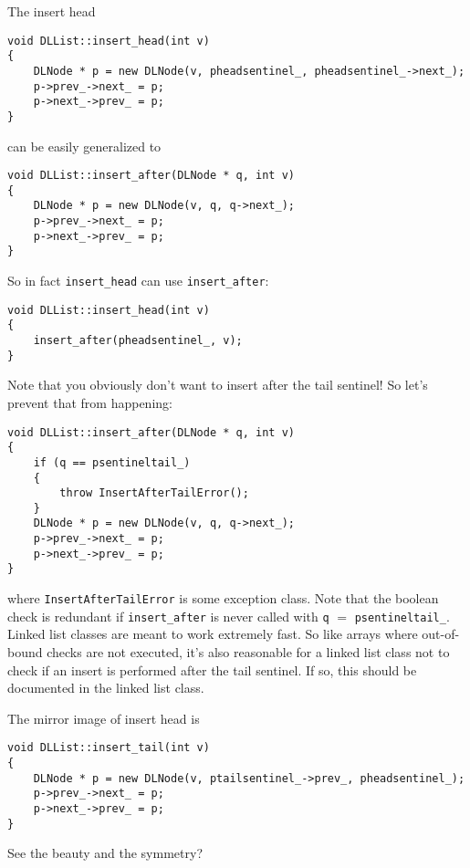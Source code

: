The insert head
\begin{Verbatim}[frame=single,fontsize=\footnotesize]
void DLList::insert_head(int v)
{
    DLNode * p = new DLNode(v, pheadsentinel_, pheadsentinel_->next_);
    p->prev_->next_ = p;
    p->next_->prev_ = p;
}
\end{Verbatim}
can be easily generalized to
\begin{Verbatim}[frame=single,fontsize=\footnotesize]
void DLList::insert_after(DLNode * q, int v)
{
    DLNode * p = new DLNode(v, q, q->next_);
    p->prev_->next_ = p;
    p->next_->prev_ = p;
}
\end{Verbatim}
So in fact \verb!insert_head! can use \verb!insert_after!:
\begin{Verbatim}[frame=single,fontsize=\footnotesize]
void DLList::insert_head(int v)
{
    insert_after(pheadsentinel_, v);
}
\end{Verbatim}
Note that you obviously don't want to insert after the tail sentinel!
So let's prevent that from happening:
\begin{Verbatim}[frame=single,fontsize=\footnotesize]
void DLList::insert_after(DLNode * q, int v)
{
    if (q == psentineltail_)
    {
        throw InsertAfterTailError();
    }
    DLNode * p = new DLNode(v, q, q->next_);
    p->prev_->next_ = p;
    p->next_->prev_ = p;
}
\end{Verbatim}
where \verb!InsertAfterTailError! is some exception class.
Note that the boolean check is redundant if \verb!insert_after!
is never called with \verb!q! $=$ \verb!psentineltail_!.
Linked list classes are meant to work extremely fast.
So like arrays where out-of-bound checks are not executed,
it's also reasonable for a linked list class not to check
if an insert is performed after the tail sentinel.
If so, this should be documented in the linked list class.

The mirror image of insert head is
\begin{Verbatim}[frame=single,fontsize=\footnotesize]
void DLList::insert_tail(int v)
{
    DLNode * p = new DLNode(v, ptailsentinel_->prev_, pheadsentinel_);
    p->prev_->next_ = p;
    p->next_->prev_ = p;
}
\end{Verbatim}
See the beauty and the symmetry?

